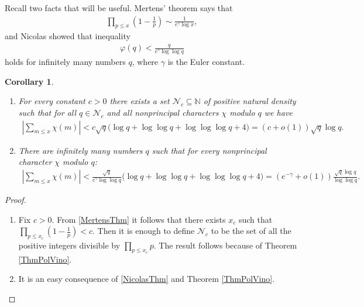 \documentclass[a4paper]{amsart}
\newtheorem{cor}[theorem]{Corollary}
\newcommand{\1}{\mathbbm{1}}
\begin{document}
Recall two facts that will be useful. Mertens' theorem \cite{Mert} says that
\begin{align}\label{MertensThm}
\prod_{p\leq x}\left(1-\frac{1}{p}\right) \sim \frac{1}{e^{\gamma}\log x},
\end{align}
and Nicolas \cite{Nico} showed that inequality
\begin{align}\label{NicolasThm}
\varphi (q) < \frac{q}{e^{\gamma} \log\log q}
\end{align}
holds for infinitely many numbers $q$, where $\gamma$ is the Euler constant. 

\begin{cor}\label{PolVinIneqCor}
\begin{enumerate}
\item For every constant $c>0$ there exists a set $\mathcal{N}_{c}\subseteq\mathbb{N}$ of positive natural density such that for all $q\in \mathcal{N}_{c}$ and all nonprincipal characters $\chi$ modulo $q$ we have
\begin{align*}
\left|\sum_{m\leq x}\chi (m)\right| < c\sqrt{q}\big(\log q + \log\log q + \log\log\log q + 4\big) =(c+o(1))\sqrt{q}\log q.
\end{align*}
\item There are infinitely many numbers $q$ such that for every nonprincipal character $\chi$ modulo $q$:
\begin{align*}
\left|\sum_{m\leq x}\chi (m)\right| < \frac{\sqrt{q}}{e^{\gamma}\log\log q}\big(\log q + \log\log q + \log\log\log q + 4\big) = (e^{-\gamma}+o(1))\frac{\sqrt{q}\log q}{\log\log q}.
\end{align*}
\end{enumerate}
\end{cor}
\begin{proof}
\begin{enumerate}
\item Fix $c>0$. From \eqref{MertensThm} it follows that there exists $x_{c}$ such that $\prod_{p\leq x_{c}}\left(1-\frac{1}{p}\right) < c$. Then it is enough to define $\mathcal{N}_{c}$ to be the set of all the positive integers divisible by $\prod_{p\leq x_{c}}p$. The result follows because of Theorem \ref{ThmPolVino}.
\item It is an easy consequence of \eqref{NicolasThm} and Theorem \ref{ThmPolVino}.
\end{enumerate}
\end{proof}
\end{document}

